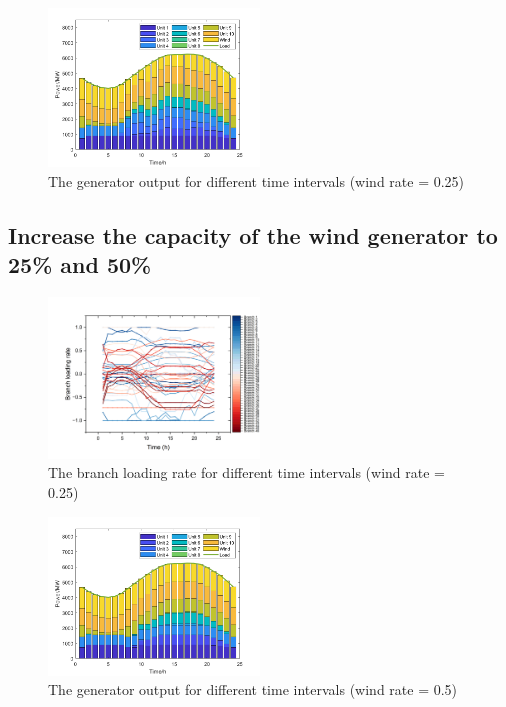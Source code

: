 \documentclass[lettersize,journal]{IEEEtran}
\begin{document}
\begin{figure}
	\centering
	\includegraphics[width=0.5\textwidth]{t2-windrate0.25}
	\caption{The generator output for different time intervals (wind rate = 0.25)}
	\label{fig_4}
\end{figure}
\subsection{Increase the capacity of the wind generator to 25\% and 50\%}

\begin{figure}
	\centering
	\includegraphics[width=0.5\textwidth]{t2-br-wr0.25}
	\caption{The branch loading rate for different time intervals (wind rate = 0.25)}
	\label{fig_2}
\end{figure}

\begin{figure}
	\centering
	\includegraphics[width=0.5\textwidth]{t2-windrate0.5}
	\caption{The generator output for different time intervals (wind rate = 0.5)}
	\label{fig_4}
\end{figure}
\end{document}
